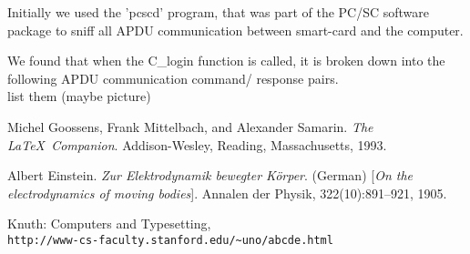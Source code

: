 \documentclass[a4paper]{report}
\begin{document}
Initially we used the 'pcscd' program, that was part of the PC/SC software package to sniff all APDU communication between smart-card and the computer.

We found that when the C\_login function is called, it is broken down into the following APDU communication command/ response pairs.\\
list them (maybe picture)









\newpage
\begin{thebibliography}{9}
Michel Goossens, Frank Mittelbach, and Alexander Samarin. 
\textit{The \LaTeX\ Companion}. 
Addison-Wesley, Reading, Massachusetts, 1993.
 
Albert Einstein. 
\textit{Zur Elektrodynamik bewegter K{\"o}rper}. (German) 
[\textit{On the electrodynamics of moving bodies}]. 
Annalen der Physik, 322(10):891–921, 1905.
 
Knuth: Computers and Typesetting,
\\\texttt{http://www-cs-faculty.stanford.edu/\~{}uno/abcde.html}
\end{thebibliography}
\end{document}
